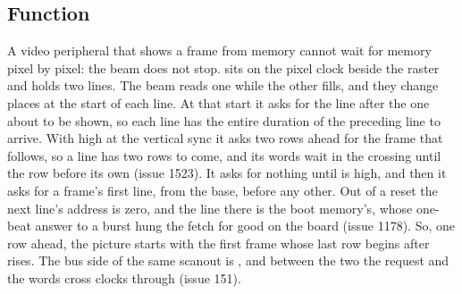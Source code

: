 
%
{}%
{}

\subsection*{Function}

A video peripheral that shows a frame from memory cannot wait for
memory pixel by pixel: the beam does not stop.  sits on
the pixel clock beside the raster and holds two lines. The beam reads
one while the other fills, and they change places at the start of each
line. At that start it asks for the line after the one about to be
shown, so each line has the entire duration of the preceding line to
arrive. With  high at the vertical sync it asks two rows
ahead for the frame that follows, so a line has two rows to come, and
its words wait in the crossing until the row before its own
(issue 1523).
It asks for nothing until  is high, and then it asks for a
frame's first line, from the base, before any other. Out of a reset
the next line's address is zero, and the line there is the boot
memory's, whose one-beat answer to a burst hung the fetch for good on
the board (issue 1178). So, one row ahead, the picture starts with
the first frame whose last row begins after  rises.
The bus side of the same scanout is , and between the
two the request and the words cross clocks through 
(issue 151).

